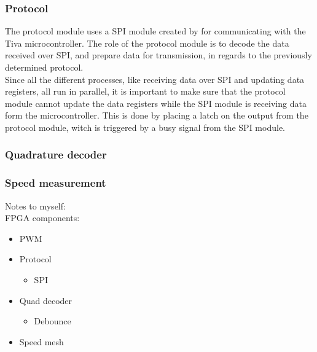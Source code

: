 \documentclass[../../../main]{subfiles}
\begin{document}
\subsubsection{Protocol}
The protocol module uses a SPI module created by  for communicating with the Tiva microcontroller.
The role of the protocol module is to decode the data received over SPI, and prepare data for transmission, in regards to the previously determined protocol.
\\
Since all the different processes, like receiving data over SPI and updating data registers, all run in parallel, it is important to make sure that the protocol module cannot update the data registers while the SPI module is receiving data form the microcontroller.
This is done by placing a latch on the output from the protocol module, witch is triggered by a busy signal from the SPI module. 

\subsubsection{Quadrature decoder}



\subsubsection{Speed measurement}



Notes to myself:\\
FPGA components:
\begin{itemize}
    \item PWM
    \item Protocol
        \begin{itemize}
            \item SPI
        \end{itemize} 
    \item Quad decoder
        \begin{itemize}
            \item Debounce
        \end{itemize}
    \item Speed mesh
\end{itemize}

\end{document}

